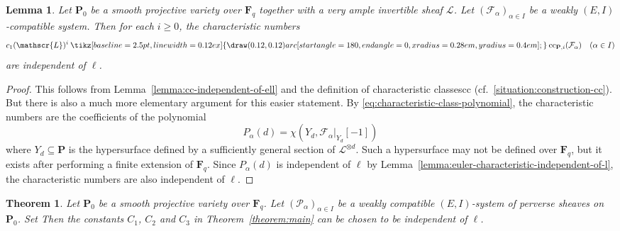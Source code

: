 \documentclass[english]{smfart}
\renewcommand{\mathbb}{\mathbf}
\renewcommand{\geq}{\geqslant}
\renewcommand{\subset}{\subseteq}
\newcommand{\capprod}{\mathbin{
  \tikz[baseline=\the\dimexpr\fontdimen22\textfont2\relax, line width=0.12ex] {
    \draw (0.12,0.12) arc[start angle=180, end angle=0, x radius=0.28em, y radius=0.4em];
  }
}}
\theoremstyle{remark}
\theoremstyle{plain}
\newtheorem{theorem}[remark]{Theorem}
\newtheorem{lemma}[remark]{Lemma}
\theoremstyle{definition}
\numberwithin{equation}{remark}
\theoremstyle{void}
\begin{document}
\begin{lemma}\label{lemma:characteristic-numbers-independent-ell}
Let \(\mathbb{P}_{0}\) be a smooth projective variety over
\(\mathbb{F}_{q}\) together with a very ample invertible sheaf
\(\mathscr{L}\).  Let \((\mathcal{F}_{\alpha})_{\alpha\in I}\) be a
weakly \((E,I)\)-compatible system.  Then for each \(i \geq 0\), the
characteristic numbers
\[
c_{1}(\mathscr{L})^{i} \capprod \mathrm{cc}_{\mathbb{P}, i}(\mathcal{F}_{\alpha})
\quad (\alpha \in I)
\]
are independent of \(\ell\).
\end{lemma}

\begin{proof}
This follows from Lemma~\ref{lemma:cc-independent-of-ell} and the
definition of characteristic classes\(\mathrm{cc}\)
(cf.~\ref{situation:construction-cc}).  But there is also a much more
elementary argument for this easier statement.  By
\eqref{eq:characteristic-class-polynomial}, the characteristic numbers
are the coefficients of the polynomial
\[
P_{\alpha}(d) = \chi(Y_{d}, \mathcal{F}_{\alpha}|_{Y_{d}}[-1])
\]
where \(Y_{d} \subset \mathbb{P}\) is the hypersurface defined by a
sufficiently general section of \(\mathscr{L}^{\otimes d}\).  Such a
hypersurface may not be defined over \(\mathbb{F}_{q}\), but it exists
after performing a finite extension of \(\mathbb{F}_{q}\).  Since
\(P_{\alpha}(d)\) is independent of \(\ell\) by
Lemma~\ref{lemma:euler-characteristic-independent-of-l}, the
characteristic numbers are also independent of \(\ell\).
\end{proof}



\begin{theorem}\label{theorem:independent-of-ell-for-main}
Let \(\mathbb{P}_0\) be a smooth projective variety over
\(\mathbb{F}_{q}\).  Let \((\mathcal{P}_{\alpha})_{\alpha\in I}\) be a
weakly compatible \((E,I)\)-system of perverse sheaves on
\(\mathbb{P}_0\).  Set Then the constants \(C_{1}\), \(C_{2}\) and
\(C_{3}\) in Theorem~\ref{theorem:main} can be chosen to be
independent of \(\ell\).
\end{theorem}
\end{document}
